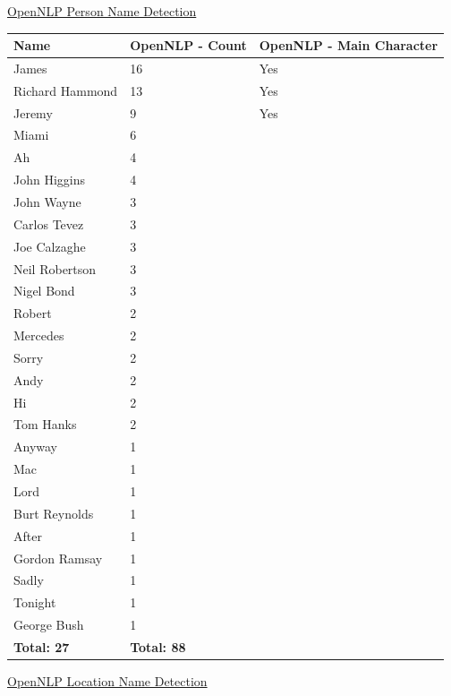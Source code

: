\newpage
\underline{OpenNLP Person Name Detection}

\begin{center}
\begin{tabular}{|p{120pt}|p{90pt}|p{180pt}|}
\hline
\textbf{Name}				&\textbf{OpenNLP - Count}	&\textbf{OpenNLP - Main Character}
\\\hline
James				&16				&Yes
\\\hline
Richard Hammond		&13				&Yes
\\\hline
Jeremy				&9				&Yes
\\\hline
Miami				&6				&
\\\hline
Ah					&4				&	
\\\hline
John Higgins			&4				&	
\\\hline
John Wayne			&3				&
\\\hline
Carlos Tevez			&3				&	
\\\hline
Joe Calzaghe			&3				&	
\\\hline
Neil Robertson			&3				&	
\\\hline
Nigel Bond			&3				&	
\\\hline
Robert				&2				&	
\\\hline
Mercedes				&2				&	
\\\hline
Sorry				&2				&	
\\\hline
Andy				&2				&	
\\\hline
Hi					&2				&
\\\hline
Tom Hanks			&2				&
\\\hline	
Anyway				&1				&	
\\\hline
Mac					&1				&	
\\\hline
Lord					&1				&	
\\\hline
Burt Reynolds			&1				&	
\\\hline
After					&1				&	
\\\hline
Gordon Ramsay		&1				&
\\\hline	
Sadly				&1				&	
\\\hline
Tonight				&1				&	
\\\hline
George Bush			&1				&	
\\\hline
\textbf{Total: 27}		&\textbf{Total: 88}	&	
\\\hline
\end{tabular}
\end{center}

\newpage
\underline{OpenNLP Location Name Detection}

